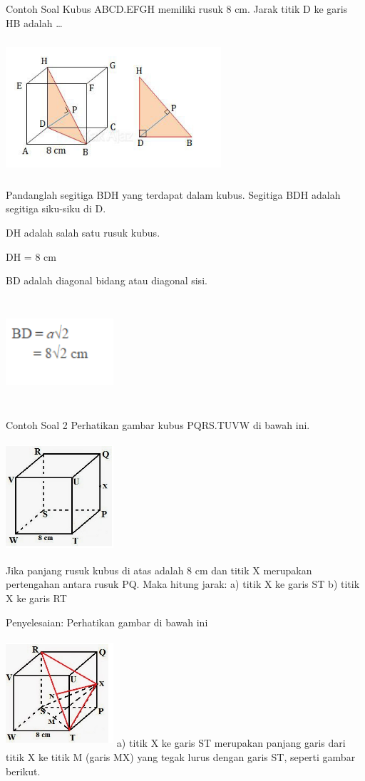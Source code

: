 \documentclass[11pt,fleqn]{book} %
\begin{document}
Contoh Soal
Kubus ABCD.EFGH memiliki rusuk 8 cm. Jarak titik D ke garis HB adalah …

\includegraphics[width = 8cm, height= 5cm]{Pictures/gi8.png}

Pandanglah segitiga BDH yang terdapat dalam kubus. Segitiga BDH adalah segitiga siku-siku di D.

DH adalah salah satu rusuk kubus.

DH = 8 cm

BD adalah diagonal bidang atau diagonal sisi.


\includegraphics[width = 4cm, height= 4cm]{Pictures/gi9.png}


Contoh Soal 2
Perhatikan gambar kubus PQRS.TUVW di bawah ini.

\includegraphics[width = 4cm, height= 4cm]{Pictures/gi10.png}

Jika panjang rusuk kubus di atas adalah 8 cm dan titik X merupakan pertengahan antara rusuk PQ. Maka hitung jarak:
a) titik X ke garis ST
b) titik X ke garis RT

Penyelesaian:
Perhatikan gambar di bawah ini

\includegraphics[width = 4cm, height= 4cm]{Pictures/gi11.png}
a) titik X ke garis ST merupakan panjang garis dari titik X ke titik M (garis MX) yang tegak lurus dengan garis ST, seperti gambar berikut.
\end{document}
